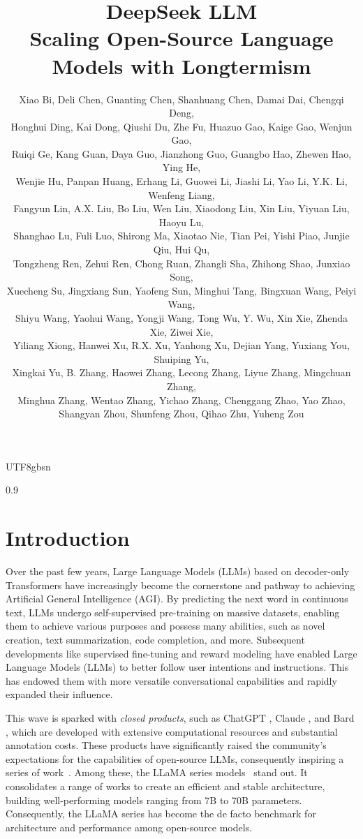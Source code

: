 \documentclass[11pt, a4paper, logo, copyright, nonumbering]{deepseek}
\title{\centering DeepSeek LLM \\ Scaling Open-Source Language Models with Longtermism}
\author[*]{
Xiao Bi, Deli Chen, Guanting Chen, Shanhuang Chen, Damai Dai, Chengqi Deng, \\
Honghui Ding, Kai Dong, Qiushi Du, Zhe Fu, Huazuo Gao, Kaige Gao, Wenjun Gao, \\ 
Ruiqi Ge, Kang Guan, Daya Guo, Jianzhong Guo, Guangbo Hao, Zhewen Hao, Ying He, \\ 
Wenjie Hu, Panpan Huang, Erhang Li, Guowei Li, Jiashi Li, Yao Li, Y.K. Li, Wenfeng Liang, \\
Fangyun Lin, A.X. Liu, Bo Liu, Wen Liu, Xiaodong Liu, Xin Liu, Yiyuan Liu, Haoyu Lu, \\
Shanghao Lu, Fuli Luo, Shirong Ma, Xiaotao Nie, Tian Pei, Yishi Piao, Junjie Qiu, Hui Qu, \\
Tongzheng Ren, Zehui Ren, Chong Ruan, Zhangli Sha, Zhihong Shao, Junxiao Song, \\
Xuecheng Su, Jingxiang Sun, Yaofeng Sun, Minghui Tang, Bingxuan Wang, Peiyi Wang, \\
Shiyu Wang, Yaohui Wang, Yongji Wang, Tong Wu, Y. Wu, Xin Xie, Zhenda Xie, Ziwei Xie, \\
Yiliang Xiong, Hanwei Xu, R.X. Xu, Yanhong Xu, Dejian Yang, Yuxiang You, Shuiping Yu, \\
Xingkai Yu, B. Zhang, Haowei Zhang, Lecong Zhang, Liyue Zhang, Mingchuan Zhang, \\
Minghua Zhang, Wentao Zhang, Yichao Zhang, Chenggang Zhao, Yao Zhao, \\
Shangyan Zhou, Shunfeng Zhou, Qihao Zhu, Yuheng Zou
}
\affil[*]{DeepSeek-AI}
\begin{document}
\begin{CJK*}{UTF8}{gbsn}

\maketitle

\newpage

\begin{spacing}{0.9}
\tableofcontents
\end{spacing}

\newpage

\section{Introduction}
Over the past few years, Large Language Models (LLMs) based on decoder-only Transformers \citep{transformer} have increasingly become the cornerstone and pathway to achieving Artificial General Intelligence (AGI). By predicting the next word in continuous text, LLMs undergo self-supervised pre-training on massive datasets, enabling them to achieve various purposes and possess many abilities, such as novel creation, text summarization, code completion, and more. Subsequent developments like supervised fine-tuning and reward modeling have enabled Large Language Models (LLMs) to better follow user intentions and instructions. This has endowed them with more versatile conversational capabilities and rapidly expanded their influence.

This wave is sparked with \emph{closed products},  such as ChatGPT \citep{chatgpt}, Claude \citep{claude}, and Bard \citep{bard}, which are developed with extensive computational resources and substantial annotation costs. These products have significantly raised the community's expectations for the capabilities of open-source LLMs, consequently inspiring a series of work~\citep{glm,llama,llama2,qwen,baichuan2,mistral}. Among these, the LLaMA series models~\citep{llama, llama2} stand out. It consolidates a range of works to create an efficient and stable architecture, building well-performing models ranging from 7B to 70B parameters. Consequently, the LLaMA series has become the de facto benchmark for architecture and performance among open-source models.


\end{CJK*}
\end{document}
